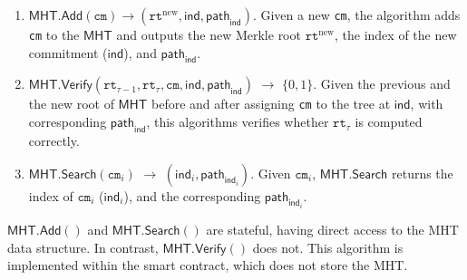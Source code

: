 \begin{enumerate} 

    \item $\mathsf{MHT}.\mathsf{Add}(\texttt{cm}) \rightarrow (\texttt{rt}^{\text{new}}, \mathsf{ind}, \mathsf{path}_\mathsf{ind})$. Given a new \texttt{cm},  the algorithm adds \texttt{cm} to the $\mathsf{MHT}$ and outputs the new Merkle root $\texttt{rt}^{\text{new}}$, the index of the new commitment ($\mathsf{ind}$), and $\mathsf{path}_\mathsf{ind}$.


    \item $\mathsf{MHT}.\mathsf{Verify}(\texttt{rt}_{\tau-1}, \texttt{rt}_{\tau}, \texttt{cm}, \mathsf{ind}, \mathsf{path}_\mathsf{ind})$ $ \rightarrow $ $\{0, 1\}$. Given the previous and the new root of $\mathsf{MHT}$ before and after assigning \texttt{cm} to the tree at  $\mathsf{ind}$, with corresponding $\mathsf{path}_\mathsf{ind}$, this algorithms verifies whether $\texttt{rt}_{\tau}$ is computed correctly.

    \item $\mathsf{MHT}.\mathsf{Search}(\texttt{cm}_i)$ $ \rightarrow $ $(\mathsf{ind}_i, \mathsf{path}_{\mathsf{ind}_i})$. Given  $\texttt{cm}_i$, $\mathsf{MHT}.\mathsf{Search}$ returns the index of  $\texttt{cm}_i$ ($\mathsf{ind}_i$), and the corresponding $\mathsf{path}_{\mathsf{ind}_i}$.
    
\end{enumerate}

$\mathsf{MHT}.\mathsf{Add}()$ and $\mathsf{MHT}.\mathsf{Search}()$ are stateful, having direct access to the \textsf{MHT} data structure. In contrast, $\mathsf{MHT}.\mathsf{Verify}()$ does not. This algorithm is implemented within the smart contract, which does not store the \textsf{MHT}. %

